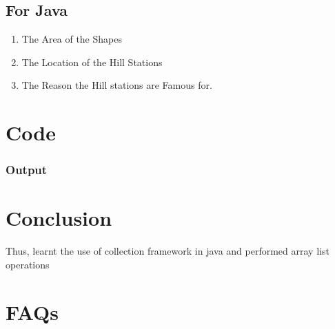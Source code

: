 \documentclass[11pt]{article}
\begin{document}
\subsection*{For Java}
\begin{enumerate}
	\item The Area of the Shapes
	\item The Location of the Hill Stations
	\item The Reason the Hill stations are Famous for.
\end{enumerate}


\section{Code}

\subsubsection{Output}



\section{Conclusion}
Thus, learnt the use of collection framework in java and performed array list operations
\pagebreak

\section{FAQs}
\end{document}
